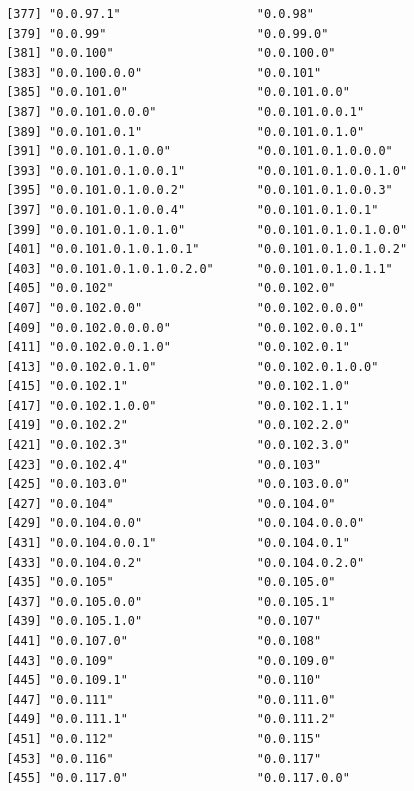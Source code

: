 \documentclass[
  letterpaper,
  DIV=11,
  numbers=noendperiod]{scrreprt}
\begin{document}
\begin{verbatim}
 [377] "0.0.97.1"                   "0.0.98"                    
 [379] "0.0.99"                     "0.0.99.0"                  
 [381] "0.0.100"                    "0.0.100.0"                 
 [383] "0.0.100.0.0"                "0.0.101"                   
 [385] "0.0.101.0"                  "0.0.101.0.0"               
 [387] "0.0.101.0.0.0"              "0.0.101.0.0.1"             
 [389] "0.0.101.0.1"                "0.0.101.0.1.0"             
 [391] "0.0.101.0.1.0.0"            "0.0.101.0.1.0.0.0"         
 [393] "0.0.101.0.1.0.0.1"          "0.0.101.0.1.0.0.1.0"       
 [395] "0.0.101.0.1.0.0.2"          "0.0.101.0.1.0.0.3"         
 [397] "0.0.101.0.1.0.0.4"          "0.0.101.0.1.0.1"           
 [399] "0.0.101.0.1.0.1.0"          "0.0.101.0.1.0.1.0.0"       
 [401] "0.0.101.0.1.0.1.0.1"        "0.0.101.0.1.0.1.0.2"       
 [403] "0.0.101.0.1.0.1.0.2.0"      "0.0.101.0.1.0.1.1"         
 [405] "0.0.102"                    "0.0.102.0"                 
 [407] "0.0.102.0.0"                "0.0.102.0.0.0"             
 [409] "0.0.102.0.0.0.0"            "0.0.102.0.0.1"             
 [411] "0.0.102.0.0.1.0"            "0.0.102.0.1"               
 [413] "0.0.102.0.1.0"              "0.0.102.0.1.0.0"           
 [415] "0.0.102.1"                  "0.0.102.1.0"               
 [417] "0.0.102.1.0.0"              "0.0.102.1.1"               
 [419] "0.0.102.2"                  "0.0.102.2.0"               
 [421] "0.0.102.3"                  "0.0.102.3.0"               
 [423] "0.0.102.4"                  "0.0.103"                   
 [425] "0.0.103.0"                  "0.0.103.0.0"               
 [427] "0.0.104"                    "0.0.104.0"                 
 [429] "0.0.104.0.0"                "0.0.104.0.0.0"             
 [431] "0.0.104.0.0.1"              "0.0.104.0.1"               
 [433] "0.0.104.0.2"                "0.0.104.0.2.0"             
 [435] "0.0.105"                    "0.0.105.0"                 
 [437] "0.0.105.0.0"                "0.0.105.1"                 
 [439] "0.0.105.1.0"                "0.0.107"                   
 [441] "0.0.107.0"                  "0.0.108"                   
 [443] "0.0.109"                    "0.0.109.0"                 
 [445] "0.0.109.1"                  "0.0.110"                   
 [447] "0.0.111"                    "0.0.111.0"                 
 [449] "0.0.111.1"                  "0.0.111.2"                 
 [451] "0.0.112"                    "0.0.115"                   
 [453] "0.0.116"                    "0.0.117"                   
 [455] "0.0.117.0"                  "0.0.117.0.0"               

\end{verbatim}
\end{document}
